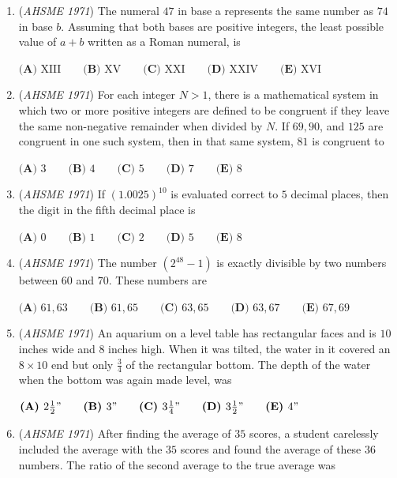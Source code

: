 \begin{enumerate}
	\item (\textit{AHSME 1971}) The numeral $47$ in base a represents the same number as $74$ in base $b$. Assuming that both bases are positive 
integers, the least possible value of $a+b$ written as a Roman numeral, is


 $\textbf{(A) }\mathrm{XIII}\qquad \textbf{(B) }\mathrm{XV}\qquad \textbf{(C) }\mathrm{XXI}\qquad \textbf{(D) }\mathrm{XXIV}\qquad \textbf{(E) }\mathrm{XVI}$


	\item (\textit{AHSME 1971}) For each integer $N>1$, there is a mathematical system in which two or more positive integers are defined 
to be congruent if they leave the same non-negative remainder when divided by $N.$ If $69,90$, and $125$ are 
congruent in one such system, then in that same system, $81$ is congruent to


 $\textbf{(A) }3\qquad \textbf{(B) }4\qquad \textbf{(C) }5\qquad \textbf{(D) }7\qquad  \textbf{(E) }8$


	\item (\textit{AHSME 1971}) If $(1.0025)^{10}$ is evaluated correct to $5$ decimal places, then the digit in the fifth decimal place is


 $\textbf{(A) }0\qquad \textbf{(B) }1\qquad \textbf{(C) }2\qquad \textbf{(D) }5\qquad  \textbf{(E) }8$


	\item (\textit{AHSME 1971}) The number $(2^{48}-1)$ is exactly divisible by two numbers between $60$ and $70$. These numbers are


 $\textbf{(A) }61,63\qquad \textbf{(B) }61,65\qquad \textbf{(C) }63,65\qquad \textbf{(D) }63,67\qquad  \textbf{(E) }67,69$


	\item (\textit{AHSME 1971}) An aquarium on a level table has rectangular faces and is $10$ inches wide and $8$ inches high. When it was tilted, 
the water in it covered an $8\times 10$ end but only $\frac{3}{4}$ of the rectangular bottom. The depth of the 
water when the bottom was again made level, was


 $\textbf{(A) }2\textstyle{\frac{1}{2}}"\qquad \textbf{(B) }3"\qquad \textbf{(C) }3\textstyle{\frac{1}{4}}"\qquad \textbf{(D) }3\textstyle{\frac{1}{2}}"\qquad \textbf{(E) }4"$


	\item (\textit{AHSME 1971}) After finding the average of $35$ scores, a student carelessly included the average with the $35$ scores and found the 
average of these $36$ numbers. The ratio of the second average to the true average was



\end{enumerate}
